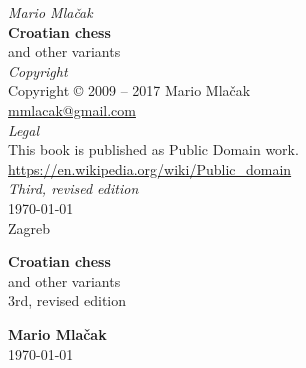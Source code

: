 \documentclass[a5paper,12pt,draft]{book} %
\begin{document}
\thispagestyle{empty}
\vspace*{0.1\textheight}
\begin{center}
    \emph{Mario Mlačak} \\
    \textbf{Croatian chess} \\
    and other variants \\ [2.0em]

    \emph{Copyright} \\
    Copyright \copyright \hspace{0.2ex} 2009 -- 2017 Mario Mlačak \\
    \href{mailto:mmlacak@gmail.com}{mmlacak@gmail.com} \\ [2.0em]

    \emph{Legal} \\
    This book is published as Public Domain work. \\
    \href{https://en.wikipedia.org/wiki/Public\_domain}{https://en.wikipedia.org/wiki/Public\_domain} \\ [2.0em]

    \emph{Third, revised edition} \\
    \today \\
    Zagreb

    \vfill

    \LaTeXe
    \vspace{0.1\textheight}
\end{center}
\clearpage %

\thispagestyle{empty}
\vspace*{0.2\textheight}
\begin{center}
    \textbf{\Large{Croatian chess}} \\ [1.0em]
    \large{and other variants} \\ [1.0em]
    \small{3rd, revised edition} \\ [2.0cm]
    \vspace*{0.2\textheight}

    \textbf{\large{Mario Mlačak}} \\ [1.0em]
    \small{\today} %
\end{center}
\clearpage %
\end{document}
